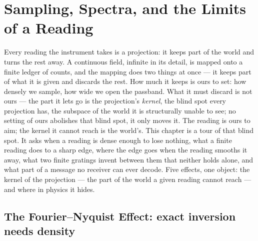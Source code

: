 \chapter{Sampling, Spectra, and the Limits of a Reading}
\label{chap:sampling-spectra-limits}

Every reading the instrument takes is a projection: it keeps part of the world and turns the rest away. A
continuous field, infinite in its detail, is mapped onto a finite ledger of counts, and the mapping does two
things at once --- it keeps part of what it is given and discards the rest. How much it keeps is ours to set:
how densely we sample, how wide we open the passband. What it must discard is not ours --- the part it lets go
is the projection's \emph{kernel}, the blind spot every projection has, the subspace of the world it is
structurally unable to see; no setting of ours abolishes that blind spot, it only moves it. The reading is
ours to aim; the kernel it cannot reach is the world's. This chapter is a tour of that blind spot. It asks
when a reading is dense enough to lose nothing, what a finite reading does to a sharp edge, where the edge goes
when the reading smooths it away, what two finite gratings invent between them that neither holds alone, and
what part of a message no receiver can ever decode. Five effects, one object: the kernel of the projection ---
the part of the world a given reading cannot reach --- and where in physics it hides.

\section{The Fourier--Nyquist Effect: exact inversion needs density}
\label{se:fourier-nyquist}

